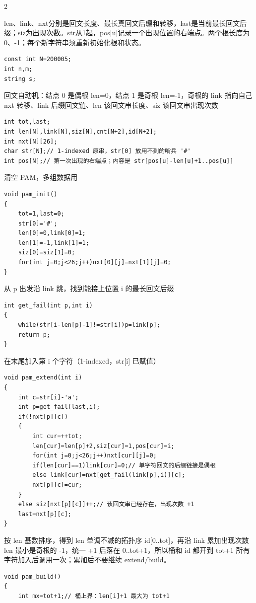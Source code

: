\documentclass[UTF8,fontset=fandol,a4paper,twoside]{ctexart}
\newcommand{\note}[1]{{\fontsize{10}{12}\selectfont #1\par}}
\begin{document}
\begin{multicols}{2}
\note{len、link、nxt分别是回文长度、最长真回文后缀和转移，last是当前最长回文后缀；siz为出现次数。str从1起，pos[\allowbreak{}u]\allowbreak{}记录一个出现位置的右端点。两个根长度为0、-\allowbreak{}1；每个新字符串须重新初始化根和状态。}
\begin{lstlisting}
const int N=200005;
int n,m;
string s;
\end{lstlisting}
\note{回文自动机：结点 0 是偶根 len=\allowbreak{}0，结点 1 是奇根 len=\allowbreak{}-\allowbreak{}1，奇根的 link 指向自己 nxt 转移、link 后缀回文链、len 该回文串长度、siz 该回文串出现次数}
\begin{lstlisting}
int tot,last;
int len[N],link[N],siz[N],cnt[N+2],id[N+2];
int nxt[N][26];
char str[N];// 1-indexed 原串，str[0] 放用不到的哨兵 '#'
int pos[N];// 第一次出现的右端点；内容是 str[pos[u]-len[u]+1..pos[u]]
\end{lstlisting}
\note{清空 PAM，多组数据用}
\begin{lstlisting}
void pam_init()
{
    tot=1,last=0;
    str[0]='#';
    len[0]=0,link[0]=1;
    len[1]=-1,link[1]=1;
    siz[0]=siz[1]=0;
    for(int j=0;j<26;j++)nxt[0][j]=nxt[1][j]=0;
}
\end{lstlisting}
\note{从 p 出发沿 link 跳，找到能接上位置 i 的最长回文后缀}
\begin{lstlisting}
int get_fail(int p,int i)
{
    while(str[i-len[p]-1]!=str[i])p=link[p];
    return p;
}
\end{lstlisting}
\note{在末尾加入第 i 个字符（1-\allowbreak{}indexed，str[\allowbreak{}i]\allowbreak{} 已赋值）}
\begin{lstlisting}
void pam_extend(int i)
{
    int c=str[i]-'a';
    int p=get_fail(last,i);
    if(!nxt[p][c])
    {
        int cur=++tot;
        len[cur]=len[p]+2,siz[cur]=1,pos[cur]=i;
        for(int j=0;j<26;j++)nxt[cur][j]=0;
        if(len[cur]==1)link[cur]=0;// 单字符回文的后缀链接是偶根
        else link[cur]=nxt[get_fail(link[p],i)][c];
        nxt[p][c]=cur;
    }
    else siz[nxt[p][c]]++;// 该回文串已经存在，出现次数 +1
    last=nxt[p][c];
}
\end{lstlisting}
\note{按 len 基数排序，得到 len 单调不减的拓扑序 id[\allowbreak{}0.\allowbreak{}.\allowbreak{}tot]\allowbreak{}，再沿 link 累加出现次数 len 最小是奇根的 -\allowbreak{}1，统一 +\allowbreak{}1 后落在 0.\allowbreak{}.\allowbreak{}tot+\allowbreak{}1，所以桶和 id 都开到 tot+\allowbreak{}1 所有字符加入后调用一次；累加后不要继续 extend/\allowbreak{}build。}
\begin{lstlisting}
void pam_build()
{
    int mx=tot+1;// 桶上界：len[i]+1 最大为 tot+1

\end{lstlisting}
\end{multicols}
\end{document}
